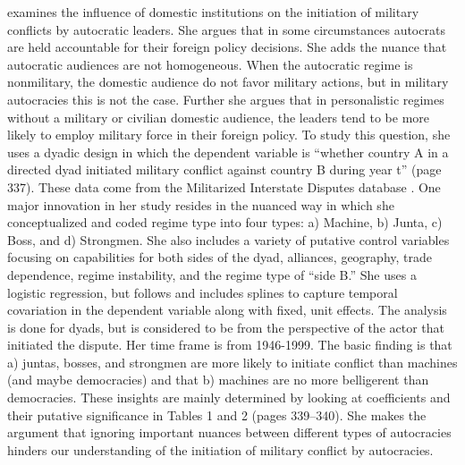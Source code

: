 \documentclass[12pt]{amsart}
\begin{document}
\citet{weeks:2012} examines the influence of domestic institutions on the initiation of military conflicts by autocratic leaders.  She argues that in some circumstances autocrats are held accountable for their foreign policy decisions. She adds the nuance that autocratic audiences are not homogeneous. When the autocratic regime is nonmilitary, the domestic audience do not favor military actions, but in military autocracies this is not the case. Further she argues that in personalistic regimes without a military or civilian domestic audience, the leaders tend to be more likely to employ military force in their foreign policy.  To study this question, she uses a dyadic design in which the dependent variable is ``whether country A in a directed dyad initiated military conflict against country B during year t'' (page 337).  These data come from the Militarized Interstate Disputes database \citep{maoz:2005}.  One major innovation in her study resides in the nuanced way in which she conceptualized and coded regime type into four types: a) Machine, b) Junta, c) Boss, and d) Strongmen. She also includes a variety of putative control variables focusing on capabilities for both sides of the dyad, alliances, geography, trade dependence, regime instability, and the regime type of ``side B.''  She uses a logistic regression, but follows \citet{beck:etal:1998} and includes splines to capture temporal covariation in the dependent variable along with  fixed, unit effects. The analysis is done for dyads, but is considered to be from the perspective of the actor that initiated the dispute. Her time frame is from 1946-1999.  The basic finding is that a) juntas, bosses, and strongmen are more likely to initiate conflict than machines (and maybe democracies) and that b) machines are no more belligerent than democracies.  These insights are mainly determined by looking at coefficients and their putative significance in Tables 1 and 2 (pages 339--340). She makes the argument that ignoring important nuances between different types of autocracies hinders our understanding of the initiation of military conflict by autocracies. 
\end{document}
